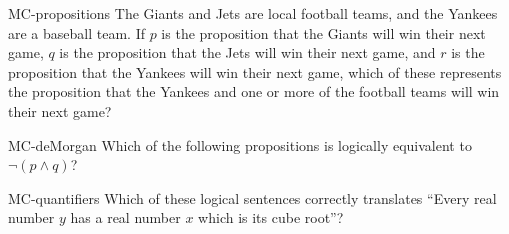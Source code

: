\documentclass[letterpaper]{ngeexam}
\begin{document}
{\begin{question}{MC-propositions}%
    The Giants and Jets are local football teams, and the Yankees are a baseball team.
    If $p$ is the proposition that the Giants will win their next game,
    $q$ is the proposition that the Jets will win their next game,
    and $r$ is the proposition that the Yankees will win their next game,
    which of these represents the proposition that the Yankees and one or more of the football teams will win their next game?
    \begin{choices}
    \end{choices}
\end{question}

\begin{question}{MC-deMorgan}%
    Which of the following propositions is logically equivalent to $\neg(p \wedge q)$?
    \begin{choices}
    \end{choices}
\end{question}

\begin{question}{MC-quantifiers}%
    Which of these logical sentences correctly translates
    ``Every real number $y$ has a real number $x$ which is its cube root''?
    \begin{choices}
    \end{choices}
\end{question}

}
\end{document}

